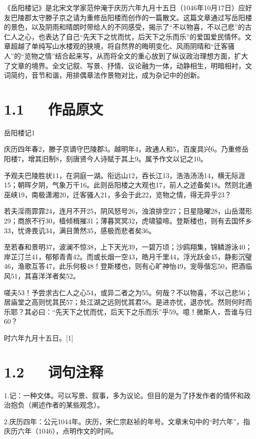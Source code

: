 \documentclass[letterpaper,10pt,english]{sphinxmanual}
\begin{document}
《岳阳楼记》是北宋文学家范仲淹于庆历六年九月十五日（1046年10月17日）应好友巴陵郡太守滕子京之请为重修岳阳楼而创作的一篇散文。这篇文章通过写岳阳楼的景色，以及阴雨和晴朗时带给人的不同感受，揭示了“不以物喜，不以己悲”的古仁人之心，也表达了自己“先天下之忧而忧，后天下之乐而乐”的爱国爱民情怀。文章超越了单纯写山水楼观的狭境，将自然界的晦明变化、风雨阴晴和“迁客骚人”的“览物之情”结合起来写，从而将全文的重心放到了纵议政治理想方面，扩大了文章的境界。全文记叙、写景、抒情、议论融为一体，动静相生，明暗相衬，文词简约，音节和谐，用排偶章法作景物对比，成为杂记中的创新。


\section{1.1   作品原文}
\label{\detokenize{p01_u6563_u6587/_u8303_u4ef2_u6df9-_u5cb3_u9633_u697c_u8bb0:id3}}
岳阳楼记1

庆历四年春2，滕子京谪守巴陵郡3。越明年4，政通人和5，百废具兴6。乃重修岳阳楼7，增其旧制8，刻唐贤今人诗赋于其上9。属予作文以记之10。

予观夫巴陵胜状11，在洞庭一湖。衔远山12，吞长江13，浩浩汤汤14，横无际涯15；朝晖夕阴，气象万千16。此则岳阳楼之大观也17，前人之述备矣18。然则北通巫峡19，南极潇湘20，迁客骚人21，多会于此22，览物之情，得无异乎23？

若夫淫雨霏霏24，连月不开25，阴风怒号26，浊浪排空27；日星隐曜28，山岳潜形29；商旅不行30，樯倾楫摧31；薄暮冥冥32，虎啸猿啼。登斯楼也，则有去国怀乡33，忧谗畏讥34，满目萧然35，感极而悲者矣36。

至若春和景明37，波澜不惊38，上下天光39，一碧万顷；沙鸥翔集，锦鳞游泳40；岸芷汀兰41，郁郁青青42。而或长烟一空43，皓月千里44，浮光跃金45，静影沉璧46，渔歌互答47，此乐何极48！登斯楼也，则有心旷神怡49，宠辱偕忘50，把酒临风51，其喜洋洋者矣52。

嗟夫53！予尝求古仁人之心54，或异二者之为55。何哉？不以物喜，不以己悲56；居庙堂之高则忧其民57；处江湖之远则忧其君58。是进亦忧，退亦忧。然则何时而乐耶？其必曰：“先天下之忧而忧，后天下之乐而乐”乎59。噫！微斯人，吾谁与归60？

时六年九月十五日。{[}1{]}


\section{1.2   词句注释}
\label{\detokenize{p01_u6563_u6587/_u8303_u4ef2_u6df9-_u5cb3_u9633_u697c_u8bb0:id4}}
1.记：一种文体。可以写景、叙事，多为议论。但目的是为了抒发作者的情怀和政治抱负（阐述作者的某些观念）。

2.庆历四年：公元1044年。庆历，宋仁宗赵祯的年号。文章末句中的“时六年”，指庆历六年（1046），点明作文的时间。
\end{document}
